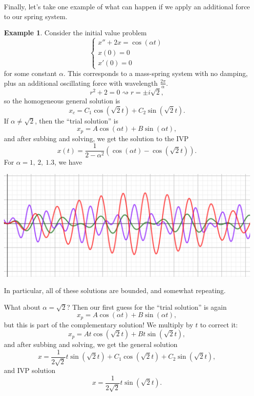 \documentclass[12pt]{amsart}
\numberwithin{equation}{section}
\theoremstyle{plain} %
\newcommand{\rsa}{\rightsquigarrow}
\theoremstyle{definition}
\newtheorem{ex}[equation]{Example}
\theoremstyle{remark}
\begin{document}
Finally, let's take one example of what can happen if we apply an additional force to our spring system.
\begin{ex}
Consider the initial value problem
\[\begin{cases} x'' + 2 x = \cos(\alpha t)\\
x(0)=0\\
x'(0)=0
\end{cases}\]
for some constant $\alpha$. This corresponds to a mass-spring system with no damping, plus an additional oscillating force with wavelength $\frac{2\pi}{\alpha}$. 
\[ r^2 + 2 = 0 \rsa r = \pm i \sqrt{2},\]
so the homogeneous general solution is
\[ x_c = C_1 \cos(\sqrt{2} t) +  C_2 \sin(\sqrt{2} t).\]
If $\alpha\neq \sqrt{2}$, then the ``trial solution'' is
\[ x_p = A \cos(\alpha t) + B \sin(\alpha t),\] and after subbing and solving, we get the solution to the IVP
\[ x(t) = \frac{1}{2-\alpha^2} \left( \cos(\alpha t) - \cos( \sqrt{2} t) \right).\]
For $\alpha=1,\ 2, \ 1.3$, we have
\begin{center}\includegraphics[scale=.5]{spring4}\end{center}
In particular, all of these solutions are bounded, and somewhat repeating.

What about $\alpha=\sqrt{2}$? Then our first guess for the ``trial solution'' is again
\[ x_p = A \cos(\alpha t) + B \sin(\alpha t),\]
but this is part of the complementary solution! We multiply by $t$ to correct it:
\[ x_p = A t \cos(\sqrt{2} t) + B t \sin(\sqrt{2} t),\]
and after subbing and solving, we get the general solution
\[ x= \frac{1}{2\sqrt{2}} t \sin(\sqrt{2} t) + C_1 \cos(\sqrt{2} t) +  C_2 \sin(\sqrt{2} t),\]
and IVP solution
\[ x= \frac{1}{2\sqrt{2}} t \sin(\sqrt{2} t).\]


\end{ex}
\end{document}
